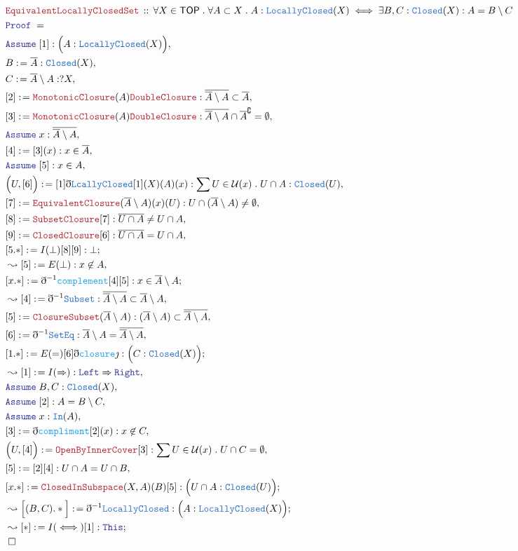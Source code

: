 \documentclass[12pt]{scrartcl}
\newcommand{\TYPE}[1]{\textcolor{NavyBlue}{\mathtt{#1}}}
\newcommand{\FUNC}[1]{\textcolor{Cerulean}{\mathtt{#1}}}
\newcommand{\LOGIC}[1]{\textcolor{Blue}{\mathtt{#1}}}
\newcommand{\THM}[1]{\textcolor{Maroon}{\mathtt{#1}}}
\renewcommand{\.}{\; . \;}
\newcommand{\de}{: \kern 0.1pc =}
\newcommand{\Theorem}[2]{& \THM{#1} \, :: \, #2 \\ & \Proof = \\ }
\newcommand{\Page}[1]{ \begin{align*} #1 \end{align*}   }
\newcommand{ \bd }{ \ByDef }
\newcommand{\Imply}{\Rightarrow}
\renewcommand{\c}{\complement}
\newcommand{\Say}[3]{& #1 \de #2 : #3, \\}
\newcommand{\Conclude}[3]{& #1 \de #2 : #3; \\}
\newcommand{\Derive}[3]{& \leadsto #1 \de #2 : #3, \\}
\newcommand{\DeriveConclude}[3]{& \leadsto #1 \de #2 : #3 ; \\}
\newcommand{\Assume}[2]{& \LOGIC{Assume} \; #1 : #2, \\}
\newcommand{\QED}{\; \square}
\newcommand{\EndProof}{& \QED \\}
\newcommand{\ByDef}{\eth}
\newcommand{\ByConstr}{\jmath}
\newcommand{\Proof}{\LOGIC{Proof} \; }
\newcommand{\TOP}{\mathsf{TOP}}
\newcommand{\U}{\mathcal{U}}
\begin{document}
\Page{
	\Theorem{EquivalentLocallyClosedSet}
	{
		\forall X \in \TOP \. 
		\forall A \subset X \.
		A : \TYPE{LocallyClosed}(X) \iff
		\exists B,C : \TYPE{Closed}(X) :
		A = B \setminus C
	}
	\Assume{[1]}{\Big( A : \TYPE{LocallyClosed}(X) \Big)}
	\Say{B}{\overline{A}}{\TYPE{Closed}(X)}
	\Say{C}{\overline{A} \setminus A}{?X}
	\Say{[2]}{\THM{MonotonicClosure}(A)\THM{DoubleClosure}}{\overline{\overline{A} \setminus A} \subset \overline{A}}
	\Say{[3]}{\THM{MonotonicClosure}(A)\THM{DoubleClosure}}{\overline{\overline{A} \setminus A} \cap \overline{A}^\c = \emptyset}
	\Assume{x}{\overline{\overline{A} \setminus A}}
	\Say{[4]}{[3](x)}{x \in \overline{A}}
	\Assume{[5]}{x \in A}
	\Say{\Big( U, [6] \Big)}{[1]\bd \TYPE{LcallyClosed}[1](X)(A)(x)}
	{
		\sum U \in \U(x) \.  U \cap A : \TYPE{Closed}(U)
	}
	\Say{[7]}{\THM{EquivalentClosure}(\overline{A} \setminus A)(x)(U)}
	{
		U \cap (\overline{A} \setminus A) \neq \emptyset
	}
	\Say{[8]}{\THM{SubsetClosure}[7]}
	{
		\overline{U \cap A} \neq U \cap A
	}
	\Say{[9]}{\THM{ClosedClosure}[6]}{\overline{U \cap A} = U \cap A}
	\Conclude{[5.*]}{I(\bot)[8][9]}{\bot}
	\Derive{[5]}{E(\bot)}{x \not \in A}
	\Conclude{[x.*]}{\bd^{-1} \FUNC{complement}[4][5]}{x \in \overline{A} \setminus A}
	\Derive{[4]}{\bd^{-1} \TYPE{Subset}}{\overline{\overline{A} \setminus A} \subset \overline{A} \setminus A}
	\Say{[5]}{\THM{ClosureSubset}(\overline{A} \setminus A)}{ 
		(\overline{A} \setminus A) \subset 
		\overline{\overline{A} \setminus A}  
	}
	\Say{[6]}{\bd^{-1}\TYPE{SetEq}}{ \overline{A} \setminus A = \overline{\overline{A} \setminus A}  } 
	\Conclude{[1.*]}{E(=)[6]\bd \FUNC{closure}\ByConstr}{ \Big( C : \TYPE{Closed}(X) \Big)}
	\Derive{[1]}{I(\Imply)}{\LOGIC{Left} \Imply \LOGIC{Right}}
	\Assume{B,C}{\TYPE{Closed}(X)}
	\Assume{[2]}{A = B \setminus C}
	\Assume{x}{\TYPE{In}(A)}
	\Say{[3]}{\bd \FUNC{compliment}[2](x)}{ x \not \in C}
	\Say{\Big(U,[4]\Big)}{\THM{OpenByInnerCover}[3]}{\sum U \in \U(x) \. U \cap C = \emptyset}
	\Say{[5]}{[2][4]}{U \cap A = U \cap B}
	\Conclude{[x.*]}{\THM{ClosedInSubspace}(X,A)(B)[5]}{\Big( U \cap A : \TYPE{Closed}(U) \Big)}
	\DeriveConclude{\Big[(B,C).*\Big]}{\bd^{-1} \TYPE{LocallyClosed}}{\Big( A : \TYPE{LocallyClosed}(X)\Big)}
	\DeriveConclude{[*]}{I(\iff)[1]}{\LOGIC{This}}
	\EndProof
}
\newpage
\end{document}
